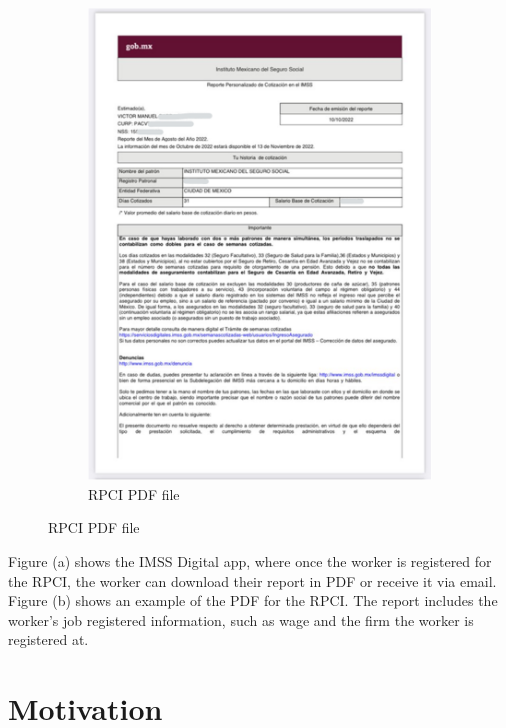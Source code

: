 \documentclass[10pt, oneside]{book}
\begin{document}
\begin{figure}[H]
\begin{center}
\begin{subfigure}{0.49\textwidth}
    \end{subfigure}
    \begin{subfigure}{0.49\textwidth}
    \caption{RPCI PDF file}
    \includegraphics[width=\textwidth]{04_Figures/rpci_app/rpci_3.png}
    \end{subfigure}
    

    \end{center}
\end{figure}
\scriptsize{
\noindent Figure (a) shows the IMSS Digital app, where once the worker is registered for the RPCI, the worker can download their report in PDF or receive it via email. Figure (b) shows an example of the PDF for the RPCI. The report includes the worker's job registered information, such as wage and the firm the worker is registered at.
} \\

\normalsize

\section{Motivation}
\end{document}
